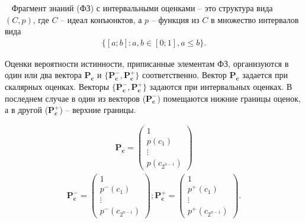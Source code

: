             \begin{Def}
            ~\cite{AVS_2011}
                Фрагмент знаний (ФЗ) с интервальными оценками -- это структура вида \begin{math}(C,p)\end{math}, где \begin{math}C\end{math} -- идеал конъюнктов, а \begin{math}p\end{math} --  функция из \begin{math}C\end{math} в множество интервалов вида 
                \begin{eqnarray*}
                    \{[a;b] : a, b \in [0;1], a \leq b\}.
                \end{eqnarray*}
            \end{Def}
           
           Оценки вероятности истинности, приписанные элементам ФЗ, организуются в один или два вектора $\mathbf{P_{c}}$ и $\{\mathbf{P_{c}^{-}}, \mathbf{P_{c}^{+}}\}$ соответственно. Вектор $\mathbf{P_{c}}$ задается при скалярных оценках. Векторы $\{\mathbf{P_{c}^{-}}, \mathbf{P_{c}^{+}}\}$ задаются при интервальных оценках. В последнем случае в один из векторов ($\mathbf{P_{c}^{-}}$) помещаются нижние границы оценок, а в другой ($ \mathbf{P_{c}^{+}}$) -- верхние границы. 
    
    \begin{eqnarray*}
        \mathbf{P_{c}} = \left( \begin{array}{c}
            1 \\
            p(c_{1}) \\
            \vdots \\
            p(c_{2^{n-1}})
        \end{array}  \right)
    \end{eqnarray*}
    \begin{eqnarray*}
        \mathbf{P_{c}^{-}} = \left( \begin{array}{c}
            1 \\
            p^{-}(c_{1}) \\
            \vdots \\
            p^{-}(c_{2^{n -1}})
        \end{array}  \right); 
        \mathbf{P_{c}^{+}} = \left( \begin{array}{c}
            1 \\
            p^{+}(c_{1}) \\
            \vdots \\
            p^{+}(c_{2^{n -1}})
        \end{array}  \right).
    \end{eqnarray*}
    
